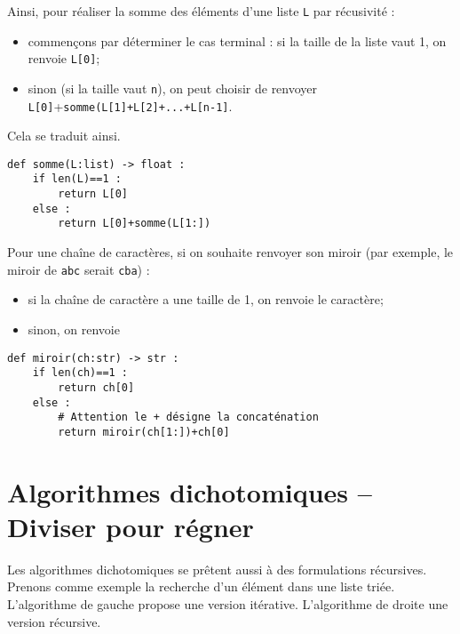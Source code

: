 \noindent\begin{minipage}[c]{.45\linewidth}

Ainsi, pour réaliser la somme des éléments d'une liste \texttt{L} par récusivité : 
\begin{itemize}
\item commençons par déterminer le cas terminal : si la taille de la liste vaut 1, on renvoie \texttt{L[0]};
\item sinon (si la taille vaut \texttt{n}), on peut choisir de renvoyer \texttt{L[0]}+\texttt{somme(L[1]+L[2]+...+L[n-1]}. 
\end{itemize}
Cela se traduit ainsi.
\begin{lstlisting}
def somme(L:list) -> float :
    if len(L)==1 : 
        return L[0]
    else :
        return L[0]+somme(L[1:])
\end{lstlisting}
\end{minipage} \hfill
\begin{minipage}[c]{.45\linewidth}
Pour une chaîne de caractères, si on souhaite renvoyer son miroir (par exemple, le miroir de \texttt{abc} serait \texttt{cba}) : 
\begin{itemize}
\item si la chaîne de caractère a une taille de 1, on renvoie le caractère;
\item sinon, on renvoie 
\end{itemize}
\begin{lstlisting}
def miroir(ch:str) -> str :
    if len(ch)==1 : 
        return ch[0]
    else :
        # Attention le + désigne la concaténation
        return miroir(ch[1:])+ch[0]
 \end{lstlisting}  
\end{minipage} 

\section{Algorithmes dichotomiques -- Diviser pour régner}

Les algorithmes dichotomiques se prêtent aussi à des formulations récursives. Prenons comme exemple la recherche d'un élément dans une liste triée. L'algorithme de gauche propose une version itérative. L'algorithme de droite une version récursive. 

